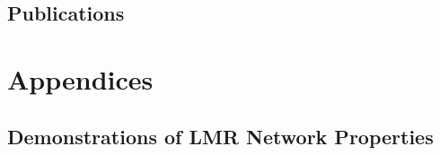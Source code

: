 \documentclass[english]{spimufcphdthesis}
\begin{document}
\chapter*{Publications}


\backmatter
 
 
 
 
 
 
 
 
 

%
 


\appendix
\part*{Appendices}
 
\mtcaddchapter
 
\chapter{Demonstrations of LMR Network Properties}
\label{appendix:lmrs}
\minitoc
\newpage




 
\end{document}

